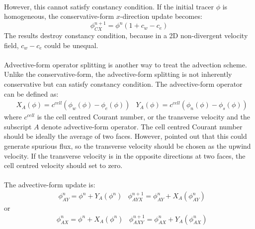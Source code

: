 \paragraph{}
However, this cannot satisfy constancy condition. If the initial tracer $\phi $ is homogeneous, the conservative-form $x$-direction update becomes:
\begin{equation} \label{eq:2.15}
\phi^{n+1}_{\scriptscriptstyle CX} = \phi^n(1 +c_{w}-c_e)
\end{equation}
The results destroy constancy condition, because in a 2D non-divergent velocity field, $c_{w}-c_e$ could be unequal. 
\paragraph{}
Advective-form operator splitting is another way to treat the advection scheme. Unlike the conservative-form, the advective-form splitting is not inherently conservative but can satisfy constancy condition. The advective-form operator can be defined as:
\begin{eqnarray} \label{eq:2.16}
&X_{\scriptscriptstyle A}(\phi ) = c^{cell}(\phi_w(\phi )-\phi_e(\phi )) 
&Y_{\scriptscriptstyle A}(\phi ) = c^{cell}(\phi_n(\phi )-\phi_s(\phi ))
\end{eqnarray}
where $c^{cell}$ is the cell centred Courant number, or the transverse velocity and the subscript $A$ denote advective-form operator. The cell centred Courant number should be ideally the average of two faces. However, \citep{Lin1996} pointed out that this could generate spurious flux, so the transverse velocity should be chosen as the upwind velocity. If the transverse velocity is in the opposite directions at two faces, the cell centred velocity should set to zero.
\paragraph{}
The advective-form update is:
\begin{eqnarray} \label{eq:2.17}
&\phi^{n}_{\scriptscriptstyle AY} = \phi^{n} +Y_{\scriptscriptstyle A}(\phi^{n}) 
&\phi^{n+1}_{\scriptscriptstyle AYX} = \phi^{n}_{\scriptscriptstyle AY} +X_{\scriptscriptstyle A}(\phi^{n}_{\scriptscriptstyle AY})
\end{eqnarray}
or
\begin{eqnarray*}
&\phi^{n}_{\scriptscriptstyle AX} = \phi^{n} +X_{\scriptscriptstyle A}(\phi^{n}) 
&\phi^{n+1}_{\scriptscriptstyle AXY} = \phi^{n}_{\scriptscriptstyle AX} +Y_{\scriptscriptstyle A}(\phi^{n}_{\scriptscriptstyle AX})
\end{eqnarray*}
